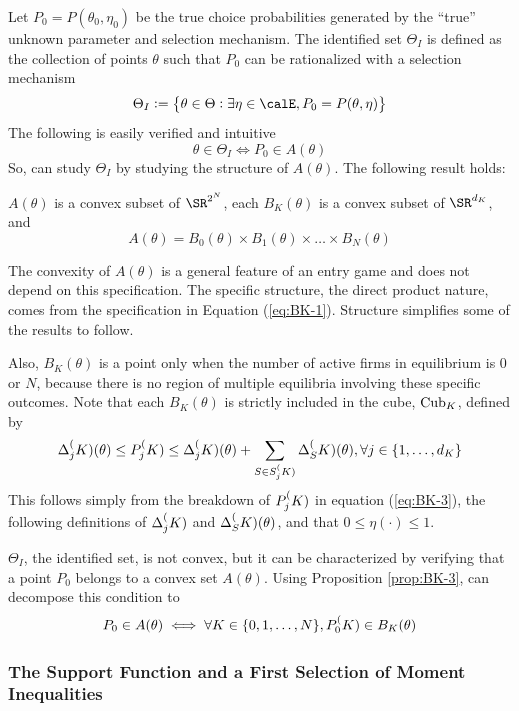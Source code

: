 Let $P_0 = P(\theta_0,\eta_0)$ be the true choice probabilities generated by the ``true'' unknown parameter and selection mechanism. The identified set $\Theta_I$ is defined as the collection of points $\theta$ such that $P_0$ can be rationalized with a selection mechanism 
\begin{equation}
	\label{eq:BK-4}
	\Theta_I := \left\{\theta\in \Theta: \exists \eta\in\calE, P_0 = P(\theta,\eta) \right\}
\end{equation}
The following is easily verified and intuitive
\begin{equation}
	\label{eq:BK-5}
	\theta\in\Theta_I \iff P_0 \in A(\theta)
\end{equation}
So, can study $\Theta_I$ by studying the structure of $A(\theta)$. The following result holds:
\begin{prop}
	\label{prop:BK-3}
	\(A(\theta)\) is a convex subset of $\SR^{2^N}$, each $B_K(\theta)$ is a convex subset of $\SR^{d_K}$, and 
	\[A(\theta) = B_0(\theta) \times B_1(\theta)\times \dots \times B_N(\theta)\]
\end{prop}
The convexity of $A(\theta)$ is a general feature of an entry game and does not depend on this specification. The specific structure, the direct product nature, comes from the specification in Equation (\ref{eq:BK-1}). Structure simplifies some of the results to follow. 

Also, $B_K(\theta)$ is a point only when the number of active firms in equilibrium is $0$ or $N$, because there is no region of multiple equilibria involving these specific outcomes. Note that each $B_K(\theta)$ is strictly included in the cube, $\operatorname{Cub}_K$, defined by 
\begin{equation}
	\label{eq:BK-6}
	\Delta_j^(K)(\theta) \leq P_j^(K) \leq \Delta_j^(K)(\theta) + \sum_{S\in S_j^(K)} \Delta_S^(K)(\theta), \forall j \in \{1,\dots, d_K\}
\end{equation}
This follows simply from the breakdown of $P_j^(K)$ in equation (\ref{eq:BK-3}), the following definitions of $\Delta_j^(K)$ and $\Delta_S^(K)(\theta)$, and that $0 \leq \eta(\cdot) \leq 1$.

$\Theta_I$, the identified set, is not convex, but it can be characterized by verifying that a point $P_0$ belongs to a convex set $A(\theta)$. Using Proposition \ref{prop:BK-3}, can decompose this condition to
\[P_0\in A(\theta)\iff \forall K \in \{0,1,\dots, N\}, P_0^(K) \in B_K(\theta)\]
\subsubsection{The Support Function and a First Selection of Moment Inequalities}

